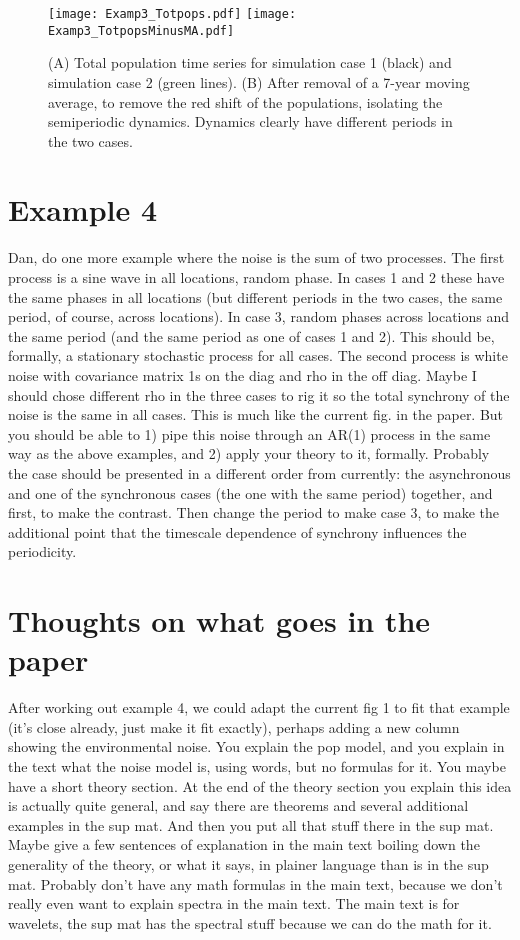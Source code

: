 \documentclass[letterpaper,11pt]{article}
\begin{document}
\begin{figure}
\texttt{[image: Examp3\_Totpops.pdf]}
\texttt{[image: Examp3\_TotpopsMinusMA.pdf]}
\caption{(A) Total population time series for simulation case 1 (black) and simulation case 2 (green lines). (B) After removal of a 7-year moving average, to remove the red
shift of the populations, isolating the semiperiodic dynamics. Dynamics clearly have different periods in the two cases. }\label{fig:example3_popts}
\end{figure}

\section{Example 4}

Dan, do one more example where the noise is the sum of two processes. The
first process is a sine wave in all locations, random phase. In cases 1 and 2 these have
the same phases in all locations (but different periods in the two cases, the same
period, of course, across locations). In case 3, random phases across locations and
the same period (and the same period as one of cases 1 and 2). This should be, 
formally, a stationary stochastic process for all cases. The second process 
is white noise with covariance matrix 1s on the diag and rho in the off diag.
Maybe I should chose different rho in the three cases to rig it so the 
total synchrony of the noise is the same in all cases.
This is much like the current fig. in the paper. But you should be able to
1) pipe this noise through an AR(1) process in the same way as the above examples, and
2) apply your theory to it, formally. Probably the case should be presented
in a different order from currently: the asynchronous and one of the synchronous
cases (the one with the same period) together, and first, to make the contrast.
Then change the period to make case 3, to make the additional point that the
timescale dependence of synchrony influences the periodicity.


\section{Thoughts on what goes in the paper}

After working out example 4, we could adapt the current fig 1 to fit that example (it's close already, just make it fit exactly), perhaps adding a new column showing the environmental noise. You explain the pop model, and you explain in the text what the noise model is, using words, but no formulas for it. You maybe have a short theory section. At the end of the theory section you explain this idea is actually quite general, and say there are theorems and several additional examples in the sup mat. And then you put all that stuff there in the sup mat. Maybe give a few sentences of explanation in the main
text boiling down the generality of the theory, or what it says, in plainer language than is in the sup mat. Probably don't have any math formulas in the main text, because we don't really even want to explain spectra in the main text. The main text is for wavelets, the sup mat has the spectral stuff because we can do the math for it.
\end{document}
